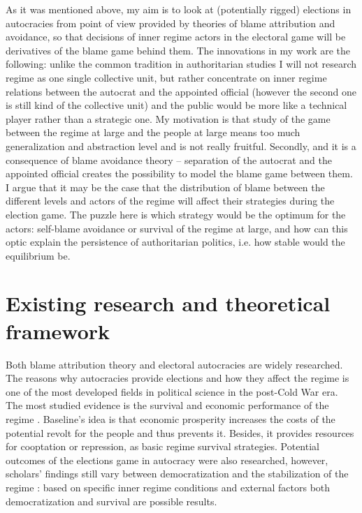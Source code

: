 \documentclass[a4paper, 12pt]{article}
\begin{document}
	\noindent As it was mentioned above, my aim is to look at (potentially rigged) elections in autocracies from point of view provided by theories of blame attribution and avoidance, so that decisions of inner regime actors in the electoral game will be derivatives of the blame game behind them. The innovations in my work are the following: unlike the common tradition in authoritarian studies \parencite{nested, dem1} I will not research regime as one single collective unit, but rather concentrate on inner regime relations between the autocrat and the appointed official (however the second one is still kind of the collective unit) and the public would be more like a technical player rather than a strategic one. My motivation is that study of the game between the regime at large and the people at large means too much generalization and abstraction level and is not really fruitful. Secondly, and it is a consequence of blame avoidance theory -- separation of the autocrat and the appointed official creates the possibility to model the blame game between them. I argue that it may be the case that the distribution of blame between the different levels and actors of the regime will affect their strategies during the election game. The puzzle here is which strategy would be the optimum for the actors: self-blame avoidance or survival of the regime at large, and how can this optic explain the persistence of authoritarian politics, i.e. how stable would the equilibrium be.
    
\section{Existing research and theoretical framework}

    \noindent Both blame attribution theory and electoral autocracies are widely researched. The reasons why autocracies provide elections and how they affect the regime is one of the most developed fields in political science in the post-Cold War era. The most studied evidence is the survival and economic performance of the regime \parencite{inst1, inst2, econorigin}. Baseline's idea is that economic prosperity increases the costs of the potential revolt for the people and thus prevents it. Besides, it provides resources for cooptation or repression, as basic regime survival strategies. Potential outcomes of the elections game in autocracy were also researched, however, scholars' findings still vary between democratization and the stabilization of the regime \parencite{stab2, dem2}: based on specific inner regime conditions and external factors both democratization and survival are possible results.
	
\end{document}

